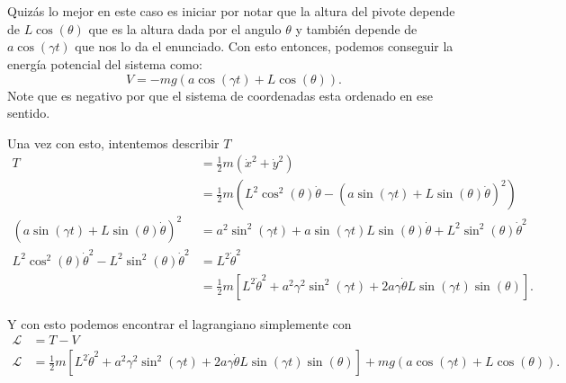 \documentclass{report}
\begin{document}
\chapter{}

Quizás lo mejor en este caso es iniciar por notar que la altura del pivote depende de $L\cos\left( \theta \right) $ que es la altura dada por el angulo $\theta$ y también depende de $a\cos\left( \gamma t \right) $ que nos lo da el enunciado. Con esto entonces, podemos conseguir la energía potencial del sistema como: \[
V = - mg\left( a\cos\left( \gamma t \right) + L \cos\left( \theta \right)  \right) 
.\] Note que es negativo por que el sistema de coordenadas esta ordenado en ese sentido.

Una vez con esto, intentemos describir $T$ 
\begin{align*}
  T &= \frac{1}{2}m\left( \dot{x}^2 + \dot{y}^2 \right)  \\
    &= \frac{1}{2}m\left( L^2\cos^2\left( \theta \right)\dot{\theta} - \left(a\sin\left( \gamma t \right) + L \sin\left( \theta \right) \dot{\theta}\right)^2  \right)  \\
  \left(a\sin\left( \gamma t \right) + L \sin\left( \theta \right) \dot{\theta}\right)^2 &= a^2\sin^2\left( \gamma t \right) + a\sin\left( \gamma t \right) L\sin\left( \theta \right) \dot{\theta}  + L^2 \sin^2\left( \theta \right) \dot{\theta}^2\\
  L^2\cos^2\left( \theta \right) \dot{\theta}^2 - L^2\sin^2\left( \theta \right) \dot{\theta}^2 &= L^2\dot{\theta}^2 \\
												&= \frac{1}{2}m \left[ L^2\dot{\theta}^2 + a^2\gamma^2\sin^2\left( \gamma t \right) + 2 a\gamma\dot{\theta}L\sin\left( \gamma t \right) \sin\left( \theta \right)   \right]
.\end{align*}

Y con esto podemos encontrar el lagrangiano simplemente con
\begin{align*}
  \mathcal{L} &= T - V \\
  \mathcal{L} &=  \frac{1}{2}m \left[ L^2\dot{\theta}^2 + a^2\gamma^2\sin^2\left( \gamma t \right) + 2 a\gamma\dot{\theta}L\sin\left( \gamma t \right) \sin\left( \theta \right)   \right] + mg\left( a\cos\left( \gamma t \right) + L \cos\left( \theta \right)  \right)
.\end{align*}

\chapter{}
\end{document}

